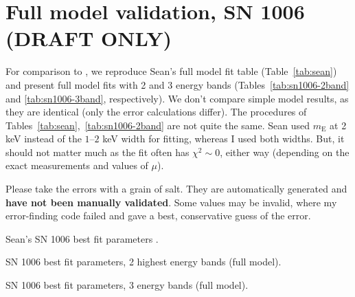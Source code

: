 \documentclass[iop, apj, numberedappendix, twocolappendix]{emulateapj}
\newcommand*{\mE}{m_\mathrm{E}}
\begin{document}
\section{Full model validation, SN 1006 (DRAFT ONLY)}

For comparison to , we reproduce Sean's full model fit
table (Table~\ref{tab:sean}) and present full model fits with 2 and 3 energy
bands (Tables~\ref{tab:sn1006-2band} and \ref{tab:sn1006-3band}, respectively).
We don't compare simple model results, as they are identical (only the error
calculations differ).
The procedures of Tables~\ref{tab:sean},~\ref{tab:sn1006-2band} are not quite
the same.  Sean used $\mE$ at 2 keV instead of the $1$--$2$ keV width for
fitting, whereas I used both widths.  But, it should not matter much as
the fit often has $\chi^2 \sim 0$, either way (depending on the exact
measurements and values of $\mu$).

Please take the errors with a grain of salt.  They are automatically
generated and \textbf{have not been manually validated}.  Some values may be
invalid, where my error-finding code failed and gave a best, conservative guess
of the error.

\begin{table}[ht]
    \tiny
    \centering
    \caption{Sean's SN 1006 best fit parameters .
    \label{tab:sean}}
    
\end{table}

\begin{table*}[ht]
    \tiny
    \centering
    \caption{SN 1006 best fit parameters, 2 highest energy bands (full model).
    \label{tab:sn1006-2band}}
    
\end{table*}

\begin{table*}[ht]
    \tiny
    \centering
    \caption{SN 1006 best fit parameters, 3 energy bands (full model).
    \label{tab:sn1006-3band}}
    
\end{table*}


\end{document}
